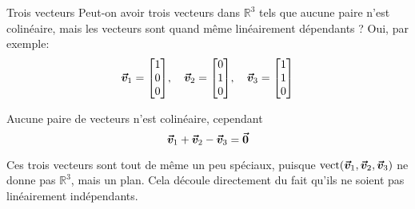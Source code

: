 \documentclass{article}
\begin{document}
\begin{parag}{Trois vecteurs}
    Peut-on avoir trois vecteurs dans $\mathbb{R}^3$ tels que aucune paire n'est colinéaire, mais les vecteurs sont quand même linéairement dépendants ? Oui, par exemple: 
    \[\bvec{v}_1 = \begin{bmatrix} 1 \\ 0 \\ 0 \end{bmatrix}, \mathspace \bvec{v}_2 = \begin{bmatrix} 0 \\ 1 \\ 0 \end{bmatrix}, \mathspace \bvec{v}_3 = \begin{bmatrix} 1 \\ 1 \\ 0 \end{bmatrix} \]
    
    Aucune paire de vecteurs n'est colinéaire, cependant 
    \[\bm{\protect\vec{v}}_1 + \bm{\protect\vec{v}}_2 - \bm{\protect\vec{v}}_3 = \bm{\protect\vec{0}}\]

    Ces trois vecteurs sont tout de même un peu spéciaux, puisque $\vect\left(\bvec{v}_1, \bvec{v}_2, \bvec{v}_3\right)$ ne donne pas $\mathbb{R}^3$, mais un plan. Cela découle directement du fait qu'ils ne soient pas linéairement indépendants.
\end{parag}
\end{document}

